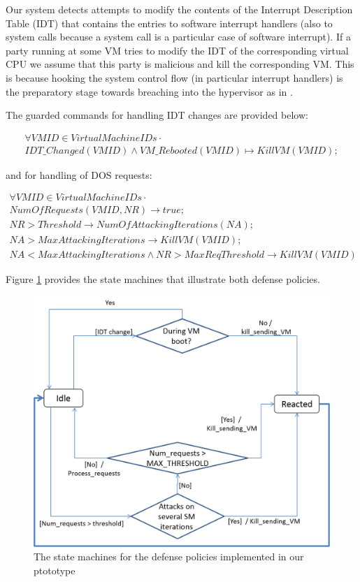 Our system detects attempts to modify the contents of the Interrupt
Description Table (IDT) that contains the entries to software interrupt
handlers (also to system calls because a system call is a particular
case of software interrupt). If a party running at some VM tries to
modify the IDT of the corresponding virtual CPU we assume that this
party is malicious and kill the corresponding VM. This is because
hooking the system control flow (in particular interrupt handlers)
is the preparatory stage towards breaching into the hypervisor as
in \cite{intel-systret,defense-rootkit-attacks,Wang:rootkits:2009}.

The guarded commands for handling IDT changes are provided below:

\begin{multline*}
\forall VMID\in VirtualMachineIDs\cdot\\
IDT\_Changed(VMID)\wedge VM\_Rebooted(VMID)\mapsto KillVM(VMID);
\end{multline*}


and for handling of DOS requests: 

\begin{multline*}
\forall VMID\in VirtualMachineIDs\cdot\\
NumOfRequests(VMID,NR)\rightarrow true;\\
NR>Threshold\rightarrow NumOfAttackingIterations(NA);\\
NA>MaxAttackingIterations\rightarrow KillVM(VMID);\\
NA<MaxAttackingIterations\wedge NR>MaxReqThreshold\rightarrow KillVM(VMID)
\end{multline*}


Figure \ref{fig:The-defense-state-machines} provides the state machines
that illustrate both defense policies.

\begin{figure}
\begin{centering}
\includegraphics[width=12cm]{pictures/defense-sms}
\par\end{centering}

\caption{\label{fig:The-defense-state-machines}The state machines for the
defense policies implemented in our ptototype}
\end{figure}



